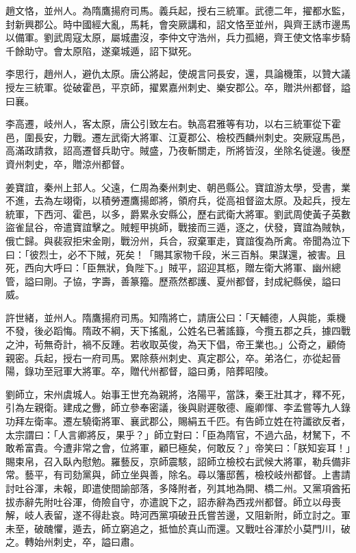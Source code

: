 \begin{pinyinscope}
 趙文恪，並州人。為隋鷹揚府司馬。義兵起，授右三統軍。武德二年，擢都水監，封新興郡公。時中國經大亂，馬耗，會突厥講和，詔文恪至並州，與齊王誘市邊馬以備軍。劉武周寇太原，屬城盡沒，李仲文守浩州，兵力孤絕，齊王使文恪率步騎千餘助守。會太原陷，遂棄城遁，詔下獄死。



 李思行，趙州人，避仇太原。唐公將起，使覘言冋長安，還，具論機策，以贊大議授左三統軍。從破霍邑，平京師，擢累嘉州刺史、樂安郡公。卒，贈洪州都督，謚曰襄。



 李高遷，岐州人，客太原，唐公引致左右。執高君雅等有功，以右三統軍從下霍邑，圍長安，力戰。遷左武衛大將軍、江夏郡公、檢校西麟州刺史。突厥寇馬邑，高滿政請救，詔高遷督兵助守。賊盛，乃夜斬關走，所將皆沒，坐除名徙邊。後歷資州刺史，卒，贈涼州都督。



 姜寶誼，秦州上邽人。父遠，仁周為秦州刺史、朝邑縣公。寶誼游太學，受書，業不進，去為左翊衛，以積勞遷鷹揚郎將，領府兵，從高祖督盜太原。及起兵，授左統軍，下西河、霍邑，以多，爵累永安縣公，歷右武衛大將軍。劉武周使黃子英數盜雀鼠谷，帝遣寶誼擊之。賊輕甲挑師，戰接而三遁，逐之，伏發，寶誼為賊執，俄亡歸。與裴寂拒宋金剛，戰汾州，兵合，寂棄軍走，寶誼復為所禽。帝聞為泣下曰：「彼烈士，必不下賊，死矣！「賜其家物千段，米三百斛。果謀還，被害。且死，西向大呼曰：「臣無狀，負陛下。」賊平，詔迎其柩，贈左衛大將軍、幽州總管，謚曰剛。子協，字壽，善篆籀。歷燕然都護、夏州都督，封成紀縣侯，謚曰威。



 許世緒，並州人。隋鷹揚府司馬。知隋將亡，請唐公曰：「天輔德，人與能，乘機不發，後必蹈悔。隋政不綱，天下搖亂，公姓名已著謠籙，今攬五郡之兵，據四戰之沖，茍無奇計，禍不反踵。若收取英俊，為天下倡，帝王業也。」公奇之，顧倚親密。兵起，授右一府司馬。累除蔡州刺史、真定郡公，卒。弟洛仁，亦從起晉陽，錄功至冠軍大將軍。卒，贈代州都督，謚曰勇，陪葬昭陵。



 劉師立，宋州虞城人。始事王世充為親將，洛陽平，當誅，秦王壯其才，釋不死，引為左親衛。建成之釁，師立參奉密議，後與尉遲敬德、龐卿惲、李孟嘗等九人錄功拜左衛率。遷左驍衛將軍、襄武郡公，賜絹五千匹。有告師立姓在符讖欲反者，太宗謂曰：「人言卿將反，果乎？」師立對曰：「臣為隋官，不過六品，材駑下，不敢希富貴。今遭非常之會，位將軍，顧巳極矣，何敢反？」帝笑曰：「朕知妄耳！」賜束帛，召入臥內慰勉。羅藝反，京師震駭，詔師立檢校右武候大將軍，勒兵備非常。藝平，有司劾黨與，師立坐與善，除名。尋以籓邸舊，檢校岐州都督。上書請討吐谷渾，未報，即遣使間諭部落，多降附者，列其地為開、橋二州。又黨項酋拓拔赤辭先附吐谷渾，倚險自守，亦遣說下之，詔赤辭為西戎州都督。師立以母喪解，岐人表留，遂不得赴哀。時河西黨項破丑氏嘗苦邊，又阻新附，師立討之。軍未至，破醜懼，遁去，師立窮追之，抵恤於真山而還。又戰吐谷渾於小莫門川，破之。轉始州刺史，卒，謚曰肅。




\end{pinyinscope}
